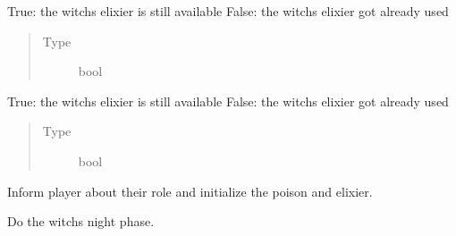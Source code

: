 \documentclass[letterpaper,10pt,english]{sphinxmanual}
\begin{document}
\begin{fulllineitems}
\begin{fulllineitems}
\begin{quote}
\begin{description}
\end{description}\end{quote}

\end{fulllineitems}



\begin{fulllineitems}
True: the witchs elixier is still available
False: the witchs elixier got already used
\begin{quote}\begin{description}
\item[{Type}] \leavevmode
bool

\end{description}\end{quote}

\end{fulllineitems}



\begin{fulllineitems}
True: the witchs elixier is still available
False: the witchs elixier got already used
\begin{quote}\begin{description}
\item[{Type}] \leavevmode
bool

\end{description}\end{quote}

\end{fulllineitems}



\begin{fulllineitems}
Inform player about their role and initialize the poison and elixier.

\end{fulllineitems}



\begin{fulllineitems}
\end{fulllineitems}



\begin{fulllineitems}
Do the witchs night phase.


\end{fulllineitems}
\end{fulllineitems}
\end{document}
